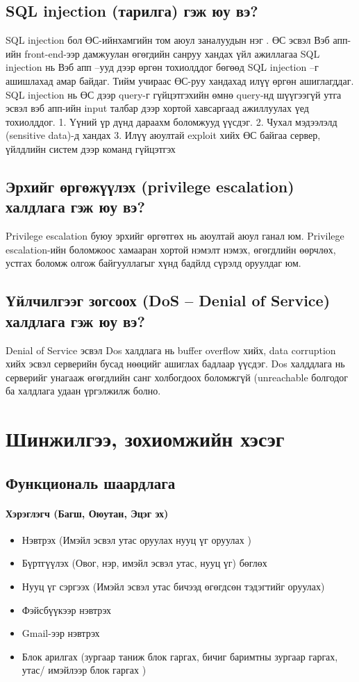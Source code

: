 \documentclass[
oneside, %
english, %
onehalfspacing, %
nolistspacing, %
headsepline, %
]{article} %
\begin{document}
			\subsection{SQL injection (тарилга) гэж юу вэ? }
		SQL injection бол ӨС-ийнхамгийн том аюул заналуудын нэг .
		ӨС эсвэл Вэб апп-ийн front-end-ээр дамжуулан өгөгдийн санруу хандах үйл ажиллагаа
		SQL injection нь Вэб апп –ууд дээр өргөн тохиолддог бөгөөд SQL injection –г ашишлахад амар байдаг.
		Тийм учираас ӨС-руу хандахад илүү өргөн ашиглагддаг.
		SQL injection нь ӨС дээр query-г гүйцэтгэхийн өмнө query-нд шүүгээгүй утга эсвэл вэб апп-ийн input талбар дээр хортой хавсаргаад ажиллуулах үед тохиолддог. 
		1. Үүний үр дүнд дараахм боломжууд үүсдэг.
		2. Чухал мэдээлэлд (sensitive data)-д хандах
		3. Илүү аюултай exploit хийх
		ӨС байгаа сервер, үйлдлийн систем дээр команд гүйцэтгэх
		
		\subsection{Эрхийг өргөжүүлэх (privilege escalation) халдлага гэж юу вэ? }	
		Privilege escalation буюу эрхийг өргөтгөх нь аюултай аюул ганал юм. 
		Privilege escalation-ийн боломжоос хамааран хортой нэмэлт нэмэх, өгөгдлийн өөрчлөх, устгах боломж олгож байгууллагыг хүнд бадйлд сүрэлд оруулдаг юм.
		
		
		\subsection{Үйлчилгээг зогсоох (DoS – Denial of Service) халдлага гэж юу вэ?}
		Denial of Service эсвэл Dos халдлага нь buffer overflow хийх, data corruption хийх эсвэл серверийн бусад нөөцийг ашиглах бадлаар үүсдэг. 
		Dos халддлага нь серверийг унагааж өгөгдлийн санг холбогдоох боломжгүй (unreachable болгодог ба халдлага удаан үргэлжилж болно.
		
	\newpage
	\section{Шинжилгээ, зохиомжийн хэсэг}
	\subsection{Функциональ шаардлага}
	\paragraph {Хэрэглэгч (Багш, Оюутан, Эцэг эх)}
	\begin{itemize}
		
	\item Нэвтрэх (Имэйл эсвэл утас оруулах нууц үг оруулах )
	\item Бүртгүүлэх (Овог, нэр, имэйл эсвэл утас, нууц үг) бөглөх
	\item Нууц үг сэргээх (Имэйл эсвэл утас бичээд өгөгдсөн тэдэгтийг оруулах)
	\item Фэйсбүүкээр нэвтрэх 
	\item Gmail-ээр нэвтрэх
	\item Блок арилгах (зургаар таниж блок гаргах, бичиг баримтны зургаар гаргах, утас/ имэйлээр блок гаргах )
	
     \end{itemize}
\end{document}
